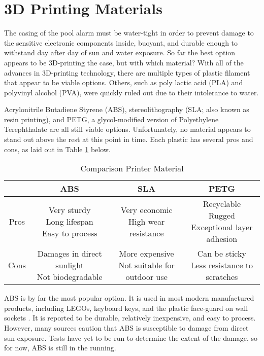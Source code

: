 \section{3D Printing Materials}



The casing of the pool alarm must be water-tight in order to prevent damage to the sensitive electronic components inside, buoyant, and durable enough to withstand day after day of sun and water exposure. So far the best option appears to be 3D-printing the case, but with which material? With all of the advances in 3D-printing technology, there are multiple types of plastic filament that appear to be viable options. Others, such as poly lactic acid (PLA) and polyvinyl alcohol (PVA), were quickly ruled out due to their intolerance to water.

Acrylonitrile Butadiene Styrene (ABS), stereolithography (SLA; also known as resin printing), and PETG, a glycol-modified version of Polyethylene Terephthalate are all still viable options. Unfortunately, no material appears to stand out above the rest at this point in time. Each plastic has several pros and cons, as laid out in Table \ref{tab:material} below.\hfill

\begin{table}[H]
\caption{Comparison Printer Material}
\begin{tabular}{c|c|c|c|}
\cline{2-4}
 & ABS & SLA & PETG \\ \hline
Pros & \makecell{Very sturdy\\ Long lifespan\\ Easy to process} & \makecell{Very economic\\ High wear resistance} & \makecell{Recyclable\\ Rugged\\ Exceptional layer adhesion} \\ \hline
Cons & \makecell{Damages in direct sunlight\\ Not biodegradable} & \makecell{More expensive\\ Not suitable for outdoor use} & \makecell{Can be sticky\\ Less resistance to scratches} \\ \hline
\end{tabular}
\centering
\label{tab:material}
\end{table}

ABS is by far the most popular option. It is used in most modern manufactured products, including LEGOs, keyboard keys, and the plastic face-guard on wall sockets \cite{abs}. It is reported to be durable, relatively inexpensive, and easy to process. However, many sources caution that ABS is susceptible to damage from direct sun exposure. Tests have yet to be run to determine the extent of the damage, so for now, ABS is still in the running.

